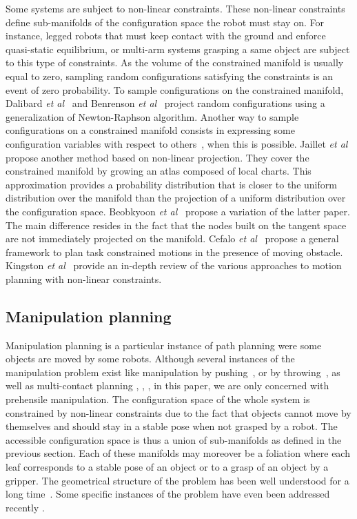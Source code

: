 Some systems are subject to non-linear constraints. These non-linear
constraints define sub-manifolds of the configuration space the robot
must stay on. For instance, legged robots that must keep contact with
the ground and enforce quasi-static equilibrium, or multi-arm systems
grasping a same object are subject to this type of constraints. As the
volume of the constrained manifold is usually equal to zero, sampling
random configurations satisfying the constraints is an event of zero
probability. To sample configurations on the constrained manifold,
{\color{blue}Dalibard \textit{et al}}~\cite{DalNakLamLau2009} and {\color{blue}Benrenson
\textit{et al}}~\cite{berenson2011} project random configurations using
a generalization of Newton-Raphson algorithm. Another way to sample
configurations on a constrained manifold consists in expressing some
configuration variables with respect to others~\cite{Cortes2002},
\cite{MirLam2018} when this is possible. {\color{blue}Jaillet \textit{et al}}~\cite{atlasRRT} propose
another method based on non-linear projection. They cover the
constrained manifold by growing an atlas composed of local
charts. This approximation provides a probability distribution that is
closer to the uniform distribution over the manifold than the
projection of a uniform distribution over the configuration
space. {\color{blue}Beobkyoon \textit{et al}}~\cite{tb-rrt2016} propose a variation of the latter paper.  The
main difference resides in the fact that the nodes built on the
tangent space are not immediately projected on the manifold.
{\color{blue}Cefalo \textit{et al}}~\cite{CefOri2019} propose a general framework to plan task constrained
motions in the presence of moving obstacle. {\color{blue}Kingston \textit{et al}}~\cite{KinMolKav2019}
provide an in-depth review of the various approaches to motion
planning with non-linear constraints.

\subsection{Manipulation planning}

Manipulation planning is a particular instance of path planning were
some objects are moved by some robots.
Although several instances of the
manipulation problem exist like manipulation by
pushing~\cite{BenRiv1998}, or by throwing~\cite{WooZacLyn2017}, as well as
multi-contact planning \cite{Bretl2006}, \cite{LenVaiYosKhe2013},
\cite{TonDelPetParManMan2018}, in this paper, we are only concerned with
prehensile manipulation.
The configuration space of the whole system is constrained by
non-linear constraints due to the fact that objects cannot move by
themselves and should stay in a stable pose when not grasped by a
robot.  The accessible configuration space is thus a union of
sub-manifolds as defined in the previous section. Each of these
manifolds may moreover be a foliation where each leaf corresponds to a
stable pose of an object or to a grasp of an object by a
gripper. The geometrical structure of the problem has been well
understood for a long time~\cite{AlaSimLau89}. Some specific instances of the
problem have even been addressed recently \cite{vendittelli-2018}.

